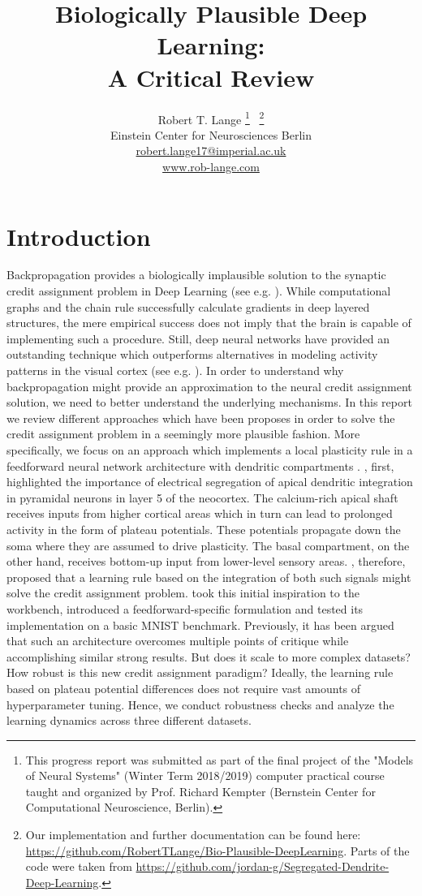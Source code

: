 \documentclass[colorinlistoftodos]{article}
\title{Biologically Plausible Deep Learning: \\
		A Critical Review}
\author{
  Robert T. Lange \thanks{This progress report was submitted as part of the final project of the "Models of Neural Systems" (Winter Term 2018/2019) computer practical course taught and organized by Prof. Richard Kempter (Bernstein Center for Computational Neuroscience, Berlin).} \ \thanks{Our implementation and further documentation can be found here: \url{https://github.com/RobertTLange/Bio-Plausible-DeepLearning}. Parts of the code were taken from \url{https://github.com/jordan-g/Segregated-Dendrite-Deep-Learning}.} \\
  Einstein Center for Neurosciences Berlin\\
  \url{robert.lange17@imperial.ac.uk} \\
  \url{www.rob-lange.com} \\
}
\theoremstyle{definition}
\begin{document}
\maketitle



\section{Introduction}

Backpropagation \citep{rumelhart1986} provides a biologically implausible solution to the synaptic credit assignment problem in Deep Learning (see e.g. \citet{lecun2015, schmidhuber2015}). While computational graphs and the chain rule successfully calculate gradients in deep layered structures, the mere empirical success does not imply that the brain is capable of implementing such a procedure. Still, deep neural networks have provided an outstanding technique which outperforms alternatives in modeling activity patterns in the visual cortex (see e.g. \citep{yamins_2016, khaligh_2014}). In order to understand why backpropagation might provide an approximation to the neural credit assignment solution, we need to better understand the underlying mechanisms.
In this report we review different approaches which have been proposes in order to solve the credit assignment problem in a seemingly more plausible fashion. More specifically, we focus on an approach which implements a local plasticity rule in a feedforward neural network architecture with dendritic compartments \citep{guerguiev2017}.
\citet{larkum_1999}, first, highlighted the importance of electrical segregation of apical dendritic integration in pyramidal neurons in layer 5 of the neocortex. The calcium-rich apical shaft receives inputs from higher cortical areas which in turn can lead to prolonged activity in the form of plateau potentials. These potentials propagate down the soma where they are assumed to drive plasticity. The basal compartment, on the other hand, receives bottom-up input from lower-level sensory areas. 
\citet{kording2001}, therefore, proposed that a learning rule based on the integration of both such signals might solve the credit assignment problem. \citet{guerguiev2017} took this initial inspiration to the workbench, introduced a feedforward-specific formulation and tested its implementation on a basic MNIST benchmark.   
Previously, it has been argued that such an architecture overcomes multiple points of critique while accomplishing similar strong results. But does it scale to more complex datasets? How robust is this new credit assignment paradigm? Ideally, the learning rule based on plateau potential differences does not require vast amounts of hyperparameter tuning. Hence, we conduct robustness checks and analyze the learning dynamics across three different datasets.
\end{document}
